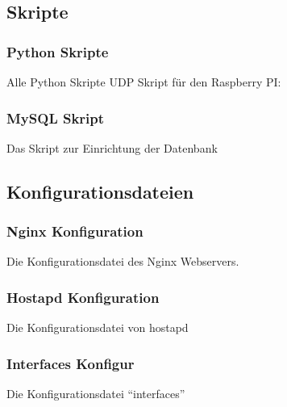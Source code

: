 
\subsection*{Skripte}  
\label{sec:Skripte-1} 

\subsubsection*{Python Skripte}
\label{sec:Pythonskripte}
Alle Python Skripte
\ac{UDP} Skript für den Raspberry PI:



\subsubsection*{MySQL Skript}
\label{sec:MySQLSkript}
Das Skript zur Einrichtung der Datenbank


\subsection*{Konfigurationsdateien}  
\label{sec:Konfigurationsdateien-1} 

\subsubsection*{Nginx Konfiguration}
\label{sec:NginxKonfiguration}
Die Konfigurationsdatei des Nginx Webservers. 



\subsubsection*{Hostapd Konfiguration}
\label{sec:HostapdSkript}
Die Konfigurationsdatei von hostapd


\subsubsection*{Interfaces Konfigur}
\label{sec:NginxSkript}
Die Konfigurationsdatei ``interfaces''


